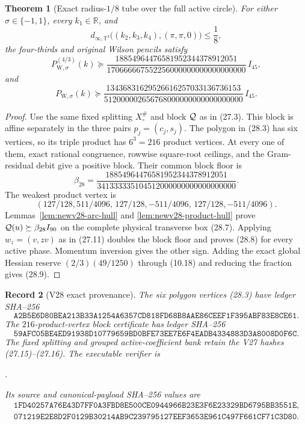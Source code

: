 \documentclass[11pt,oneside]{article}
\newtheorem{theorem}{Theorem}[section]
\newtheorem{record}[theorem]{Record}
\theoremstyle{definition}
\theoremstyle{remark}
\begin{document}
\begin{theorem}[Exact radius-\(1/8\) tube over the full active circle]
\label{thm:newv28-arc-tube}
For either \(\sigma\in\{-1,1\}\), every \(k_1\in\mathbb R\), and
\[
 d_{\infty,\mathbb T^3}
 \bigl((k_2,k_3,k_4),(\pi,\pi,0)\bigr)\le\frac18,        \tag{28.7}
\]
the four-thirds and original Wilson pencils satisfy
\[
 P_{\mathrm W,\sigma}^{(4/3)}(k)\succeq
 \frac{18854964476581952344378912051}
 {170666667552256000000000000000000}\,I_{45},           \tag{28.8}
\]
and
\[
 P_{\mathrm W,\sigma}(k)\succeq
 \frac{13436831629526616257033136736153}
 {512000002656768000000000000000000}\,I_{45}.           \tag{28.9}
\]
\end{theorem}

\begin{proof}
Use the same fixed splitting \(X_\circ^\#\) and block
\({\cal Q}\) as in (27.3).  This block is affine separately in the
three pairs \(p_j=(c_j,s_j)\).  The polygon in (28.3) has six
vertices, so its triple product has \(6^3=216\) product vertices.
At every one of them, exact rational congruence, rowwise
square-root ceilings, and the Gram-residual debit give a positive
block.  Their common block floor is
\[
 \beta_{28}=
 \frac{18854964476581952344378912051}
 {341333335104512000000000000000000}.                   \tag{28.10}
\]
The weakest product vertex is
\[
 (127/128,511/4096,\,
   127/128,-511/4096,\,
   127/128,-511/4096).                                  \tag{28.11}
\]
Lemmas~\ref{lem:newv28-arc-hull} and
\ref{lem:newv28-product-hull} prove
\({\cal Q}(u)\succeq\beta_{28}I_{90}\) on the complete physical
transverse box (28.7).  Applying \(w_z=(v,zv)\) as in (27.11)
doubles the block floor and proves (28.8) for every active phase.
Momentum inversion gives the other sign.  Adding the exact global
Hessian reserve \((2/3)(49/1250)\) through (10.18) and reducing the
fraction gives (28.9).
\end{proof}

\begin{record}[V28 exact provenance]
\label{rec:newv28-provenance}
The six polygon vertices (28.3) have ledger SHA--256
\[
\texttt{A2B5E6D80BEA213B33A1254A6357CD818FD68B8AAE86CEEF1F395ABF83E8CE61}.
                                                               \tag{28.12}
\]
The \(216\)-product-vertex block certificate has ledger SHA--256
\[
\texttt{59AFC05BE4ED91938D10779659BD0BFE73EE7E6F4EADB4334883D3A8008D0F6C}.
                                                               \tag{28.13}
\]
The fixed splitting and grouped active-coefficient bank retain the
V27 hashes (27.15)--(27.16).  The executable verifier is
\begin{center}
\footnotesize
{}.
\end{center}
Its source and canonical-payload SHA--256 values are
\[
\begin{gathered}
\texttt{1FD40257A76E43D7FF0A3FBD8E500CE0944966B23E3F6E23329BD6795BB3551E},\\
\texttt{071219E2E8D2F0129B30214AB9C239795127EEF3653E961C497F661CF71C3D80}.
\end{gathered}                                          \tag{28.14}
\]
\end{record}
\end{document}
